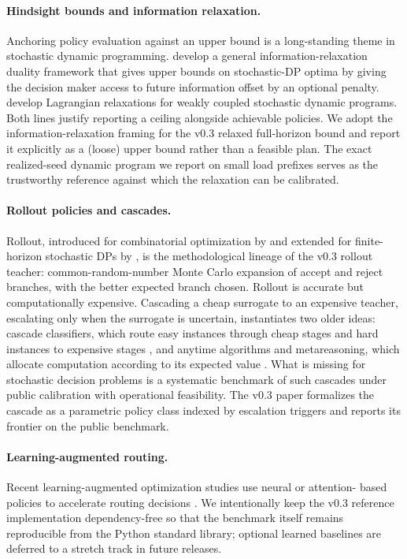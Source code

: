 \documentclass[11pt]{article}
\begin{document}
\paragraph{Hindsight bounds and information relaxation.}
Anchoring policy evaluation against an upper bound is a long-standing
theme in stochastic dynamic programming. \citet{brown2010information}
develop a general information-relaxation duality framework that gives
upper bounds on stochastic-DP optima by giving the decision maker access
to future information offset by an optional penalty.
\citet{adelman2008relaxations} develop Lagrangian relaxations for weakly
coupled stochastic dynamic programs. Both lines justify reporting a
ceiling alongside achievable policies. We adopt the
information-relaxation framing for the v0.3 relaxed full-horizon bound and
report it explicitly as a (loose) upper bound rather than a feasible
plan. The exact realized-seed dynamic program we report on small load
prefixes serves as the trustworthy reference against which the relaxation
can be calibrated.

\paragraph{Rollout policies and cascades.}
Rollout, introduced for combinatorial optimization by
\citet{bertsekas1997rollout} and extended for finite-horizon stochastic DPs
by \citet{goodson2017rollout}, is the methodological lineage of the v0.3
rollout teacher: common-random-number Monte Carlo expansion of accept and
reject branches, with the better expected branch chosen. Rollout is
accurate but computationally expensive. Cascading a cheap surrogate to an
expensive teacher, escalating only when the surrogate is uncertain,
instantiates two older ideas: cascade classifiers, which route easy
instances through cheap stages and hard instances to expensive stages
\citep{violajones2001}, and anytime algorithms and metareasoning, which
allocate computation according to its expected value
\citep{boddydean1989,zilberstein1996,russellwefald1991,horvitz1988}. What
is missing for stochastic decision problems is a systematic benchmark of
such cascades under public calibration with operational feasibility. The
v0.3 paper formalizes the cascade as a parametric policy class indexed by
escalation triggers and reports its frontier on the public benchmark.

\paragraph{Learning-augmented routing.}
Recent learning-augmented optimization studies use neural or attention-
based policies to accelerate routing decisions
\citep{nazari2018rlvrp,kool2019attention,patel2022neur2sp}. We intentionally
keep the v0.3 reference implementation dependency-free so that the
benchmark itself remains reproducible from the Python standard library;
optional learned baselines are deferred to a stretch track in future
releases.
\end{document}
